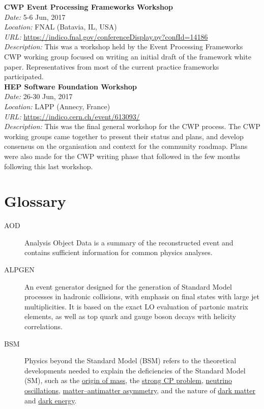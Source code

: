 \documentclass[12pt,a4paper]{article}
\begin{document}
\begin{appendices}
\noindent
\textbf{CWP Event Processing Frameworks Workshop}\\
\emph{Date:} 5-6 Jun, 2017\\
\emph{Location:} FNAL (Batavia, IL, USA)\\
\emph{URL:}
\href{https://indico.fnal.gov/conferenceDisplay.py?confId=14186}{{https://indico.fnal.gov/conferenceDisplay.py?confId=14186}}\\
\emph{Description:} This was a workshop held by the Event Processing Frameworks
CWP working group focused on writing an initial draft of the framework
white paper. Representatives from most of the current practice
frameworks participated.\\

\noindent
\textbf{HEP Software Foundation Workshop}\\
\emph{Date:} 26-30 Jun, 2017\\
\emph{Location:} LAPP (Annecy, France)\\
\emph{URL:}
\href{https://indico.cern.ch/event/613093/}{{https://indico.cern.ch/event/613093/}}\\
\emph{Description:} This was the final general workshop for the CWP
process. The CWP working groups came together to present their status
and plans, and develop consensus on the organisation and context for the
community roadmap. Plans were also made for the CWP writing phase that
followed in the few months following this last workshop.

\newpage
\hypertarget{appendix-b-glossary}{%
\section{Glossary}\label{appendix-b-glossary}}

\begin{description}

\item[AOD] Analysis Object Data is a summary of the reconstructed event and
contains sufficient information for common physics analyses.

\item[ALPGEN] An event generator designed for the generation of Standard Model
processes in hadronic collisions, with emphasis on final states with
large jet multiplicities. It is based on the exact LO evaluation of
partonic matrix elements, as well as top quark and gauge boson decays
with helicity correlations.

\item[BSM] Physics beyond the Standard Model (BSM) refers to the theoretical
developments needed to explain the deficiencies of the Standard Model
(SM), such as the
\href{https://en.wikipedia.org/wiki/Origin_of_mass}{origin of mass}, the
\href{https://en.wikipedia.org/wiki/Strong_CP_problem}{strong CP
problem},
\href{https://en.wikipedia.org/wiki/Neutrino_oscillation}{neutrino
oscillations},
\href{https://en.wikipedia.org/wiki/Baryon_asymmetry}{matter--antimatter
asymmetry}, and the nature of
\href{https://en.wikipedia.org/wiki/Dark_matter}{dark matter} and
\href{https://en.wikipedia.org/wiki/Dark_energy}{dark energy}.


\end{description}
\end{appendices}
\end{document}

